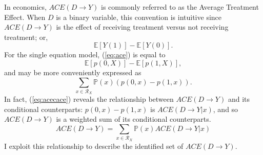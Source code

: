 \documentclass[12pt,a4paper,twoside]{article}
\numberwithin{equation}{section}
\begin{document}
In economics, $ACE(D\rightarrow Y)$ is commonly referred to as the Average Treatment Effect. When $D$ is a binary variable, this convention is intuitive since $ACE(D\rightarrow Y)$ is the effect of receiving treatment versus not receiving treatment; or,
\begin{equation}
\mathbb{E}[Y(1)]-\mathbb{E}[Y(0)].\label{eq:ace}
\end{equation}
For the single equation model, (\ref{eq:ace}) is equal to
\[\mathbb{E}[p(0,X)]-\mathbb{E}[p(1,X)],\]
and may be more conveniently expressed as
\begin{equation}
\sum_{x\in\mathcal{R}_X}\mathbb{P}(x)(p(0,x)-p(1,x)).\label{eq:acecace}
\end{equation}
In fact, (\ref{eq:acecace}) reveals the relationship between $ACE(D\rightarrow Y)$ and its conditional counterparts: $p(0,x)-p(1,x)$ is $ACE(D\rightarrow Y|x)$, and so $ACE(D\rightarrow Y)$ is a weighted sum of its conditional counterparts.
\[ACE(D\rightarrow Y)=\sum_{x\in\mathcal{R}_X}\mathbb{P}(x)ACE(D\rightarrow Y|x)\] 
I exploit this relationship to describe the identified set of $ACE(D\rightarrow Y)$.
\end{document}
